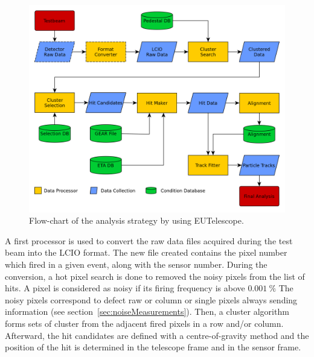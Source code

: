     \begin{figure}[!h]
      \centering
      \includegraphics[width = \textwidth]{Pictures/X0/eutel-strategy.png}
      \caption{Flow-chart of the analysis strategy by using EUTelescope\cite{EUTelFlowChart}.}
      \label{fig:eutel-strategy}
    \end{figure}

    A first processor is used to convert the raw data files acquired during the test beam into the LCIO format.
    The new file created contains the pixel number which fired in a given event, along with the sensor number.
    During the conversion, a hot pixel search is done to removed the noisy pixels from the list of hits.
    A pixel is considered as noisy if its firing frequency is above $0.001~\%$
    The noisy pixels correspond to defect raw or column or single pixels always sending information (see section~\ref{sec:noiseMeasurements}).
    Then, a cluster algorithm forms sets of cluster from the adjacent fired pixels in a row and/or column.
    Afterward, the hit candidates are defined with a centre-of-gravity method and the position of the hit is determined in the telescope frame and in the sensor frame.

